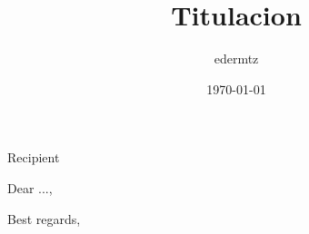 \documentclass[foldmarks=off,fromalign=right,backaddress=false,fromemail=false,fromurl=false,fromlogo=false,fromphone=true]{scrlttr2}
\title{Titulacion}
\author{edermtz}
\date{\today}
\begin{document}
	\begin{letter}{Recipient}
		\opening{Dear ...,}
		
		\closing{Best regards,}
	\end{letter}
\end{document}
